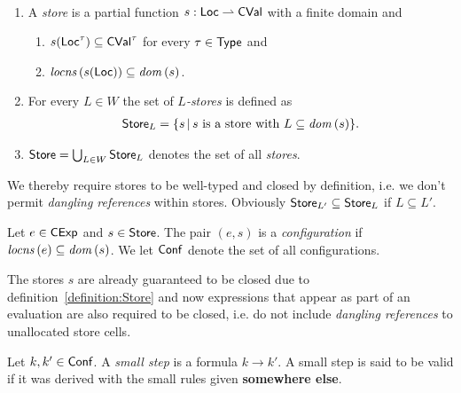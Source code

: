 \documentclass[12pt,a4paper]{report}
\newcommand{\CExp}{\sstyle{CExp}}
\newcommand{\CVal}{\sstyle{CVal}}
\newcommand{\Conf}{\sstyle{Conf}}
\begin{document}
\begin{definition}[Store] \label{definition:Store} \
  \begin{enumerate}
    \item A {\em store} is a partial function $s:\Loc \pto \CVal$ with a finite domain and
          \begin{enumerate}
            \item $s(\Loc^\tau) \subseteq \CVal^\tau$ for every $\tau\in\mathsf{Type}$ and
            \item $\mathit{locns}\,(s(\mathsf{Loc})) \subseteq \mathit{dom}\,(s)$.
          \end{enumerate}

    \item For every $L \in W$ the set of {\em $L$-stores} is defined as
          \[\begin{array}{l}
            \mathsf{Store}_L = \{s\,|\,\text{$s$ is a store with $L\subseteq\mathit{dom}\,(s)$}\}.
          \end{array}\]

    \item $\mathsf{Store} = \bigcup_{L \in W} \mathsf{Store}_L$ denotes the set of all {\em stores}.
  \end{enumerate}
\end{definition}

We thereby require stores to be well-typed and closed by definition, i.e. we don't permit {\em dangling
references} within stores. Obviously $\mathsf{Store}_{L'} \subseteq \mathsf{Store}_L$ if $L \subseteq L'$.

\begin{definition}[Configuration]
  Let $e\in\CExp$ and $s\in\mathsf{Store}$. The pair $(e,s)$ is a {\em configuration}
  if $\mathit{locns}\,(e) \subseteq \mathit{dom}\,(s)$. We let $\Conf$ denote the set of all configurations.
\end{definition}

The stores $s$ are already guaranteed to be closed due to definition~\ref{definition:Store} and
now expressions that appear as part of an evaluation are also required to be closed, i.e. do not
include {\em dangling references} to unallocated store cells.


\begin{definition}
  Let $k,k'\in\Conf$. A {\em small step} is a formula
  $k \to k'$. A small step is said to be valid if it was derived with
  the small rules given {\bf somewhere else}.
\end{definition}
\end{document}
